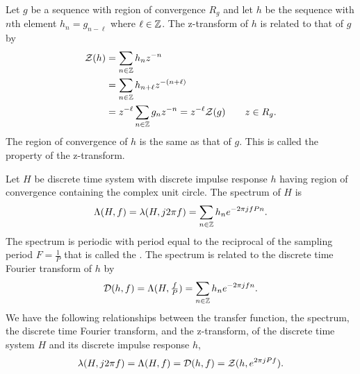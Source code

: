 Let $g$ be a sequence with region of convergence $R_g$ and let $h$ be the sequence with $n$th element $h_n = g_{n-\ell}$ where $\ell \in {\mathbb Z}$.  The z-transform of $h$ is related to that of $g$ by
\begin{align}
{\mathcal Z}(h) &= \sum_{n \in {\mathbb Z}} h_n z^{-n} \nonumber \\
&= \sum_{n \in {\mathbb Z}} h_{n+\ell} z^{-(n+\ell)} \nonumber \\
&= z^{-\ell} \sum_{n \in {\mathbb Z}} g_n z^{-n} = z^{-\ell} {\mathcal Z}(g) \qquad z \in R_g. \label{eq:timeshiftpropertyztransform}
\end{align}
The region of convergence of $h$ is the same as that of $g$.  This is called the  property of the z-transform.  %

Let $H$ be discrete time system with discrete impulse response $h$ having region of convergence containing the complex unit circle.  The spectrum of $H$ is
\[
\Lambda(H,f) = \lambda(H, j2\pi f) = \sum_{n \in {\mathbb Z}} h_n e^{-2\pi j f P n}.
\]
The spectrum is periodic with period equal to the reciprocal of the sampling period $F = \frac{1}{P}$ that is called the . The spectrum is related to the discrete time Fourier transform of $h$ by
\[
{\mathcal D}(h,f) = \Lambda(H,\tfrac{f}{P}) =\sum_{n \in {\mathbb Z}} h_n e^{-2\pi j f n}.
\]
We have the following relationships between the transfer function, the spectrum, the discrete time Fourier transform, and the z-transform, of the discrete time system $H$ and its discrete impulse response $h$,
\[
\lambda(H, j2\pi f) = \Lambda(H,f) = {\mathcal D}(h,f) = {\mathcal Z}(h, e^{2\pi j P f}).
\]


